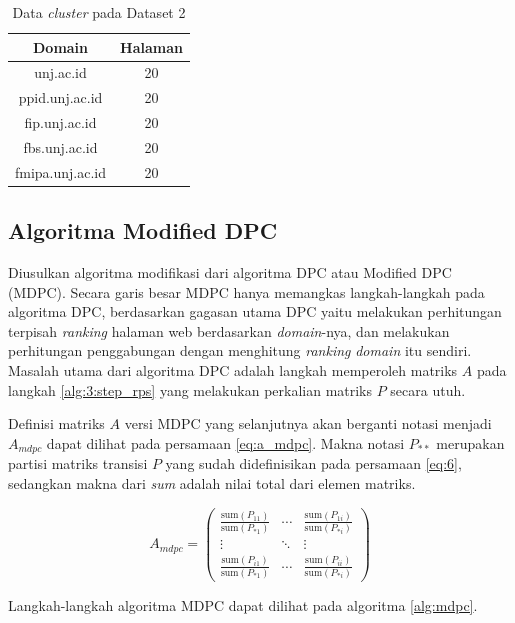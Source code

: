 \documentclass[
	a4paper, %
	12pt, %
	unnumberedsections, %
	twoside, %
]{LTJournalArticle}
\begin{document}
\begin{table}
	\centering
	\caption{Data \textit{cluster} pada Dataset 2}
	\label{domain:dataset2}
	\begin{tabular}{|c|c|}
	\hline
	\textbf{Domain} & \textbf{Halaman} \\
	\hline
	unj.ac.id & 20 \\
	ppid.unj.ac.id & 20 \\
	fip.unj.ac.id & 20 \\
	fbs.unj.ac.id & 20 \\
	fmipa.unj.ac.id & 20 \\
	\hline
	\end{tabular}
\end{table}

\subsection{Algoritma Modified DPC}

Diusulkan algoritma modifikasi dari algoritma DPC atau Modified DPC (MDPC). Secara garis besar MDPC hanya memangkas langkah-langkah pada algoritma DPC, berdasarkan gagasan utama DPC yaitu melakukan perhitungan terpisah \textit{ranking} halaman web berdasarkan \textit{domain}-nya, dan melakukan perhitungan penggabungan dengan menghitung \textit{ranking} \textit{domain} itu sendiri. Masalah utama dari algoritma DPC adalah langkah memperoleh matriks $A$ pada langkah \ref{alg:3:step_rps} yang melakukan perkalian matriks $P$ secara utuh.

Definisi matriks $A$ versi MDPC yang selanjutnya akan berganti notasi menjadi $A_{mdpc}$ dapat dilihat pada persamaan \ref{eq:a_mdpc}. Makna notasi $P_{**}$ merupakan partisi matriks transisi $P$ yang sudah didefinisikan pada persamaan \ref{eq:6}, sedangkan makna dari \textit{sum} adalah nilai total dari elemen matriks.

\begin{equation}
	\label{eq:a_mdpc}
	A_{mdpc} =
	\begin{pmatrix}
		\frac{\text{sum}(P_{11})}{\text{sum}(P_{*1})} & \cdots & \frac{\text{sum}(P_{1i})}{\text{sum}(P_{*i})} \\
		\vdots & \ddots & \vdots \\
		\frac{\text{sum}(P_{i1})}{\text{sum}(P_{*1})} & \cdots & \frac{\text{sum}(P_{ii})}{\text{sum}(P_{*i})}
	\end{pmatrix}
\end{equation}

Langkah-langkah algoritma MDPC dapat dilihat pada algoritma \ref{alg:mdpc}.
\end{document}
